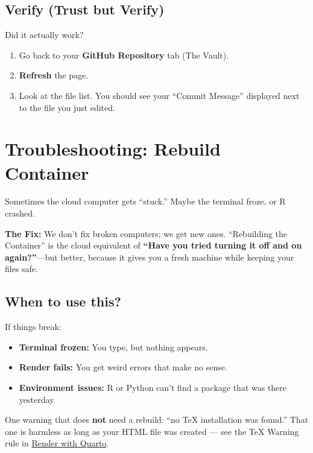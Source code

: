 \documentclass[
  letterpaper,
  DIV=11,
  numbers=noendperiod,
  oneside]{scrreprt}
\providecommand{\tightlist}{%
  \setlength{\itemsep}{0pt}\setlength{\parskip}{0pt}}
\begin{document}
\section{Verify (Trust but Verify)}\label{verify-trust-but-verify}

Did it actually work?

\begin{enumerate}
\def\labelenumi{\arabic{enumi}.}
\tightlist
\item
  Go back to your \textbf{GitHub Repository} tab (The Vault).
\item
  \textbf{Refresh} the page.
\item
  Look at the file list. You should see your ``Commit Message''
  displayed next to the file you just edited.
\end{enumerate}

\chapter{Troubleshooting: Rebuild
Container}\label{troubleshooting-rebuild-container}

Sometimes the cloud computer gets ``stuck.'' Maybe the terminal froze,
or R crashed.

\textbf{The Fix:} We don't fix broken computers; we get new ones.
``Rebuilding the Container'' is the cloud equivalent of \textbf{``Have
you tried turning it off and on again?''}---but better, because it gives
you a fresh machine while keeping your files safe.

\section{When to use this?}\label{when-to-use-this}

If things break:

\begin{itemize}
\tightlist
\item
  \textbf{Terminal frozen:} You type, but nothing appears.
\item
  \textbf{Render fails:} You get weird errors that make no sense.
\item
  \textbf{Environment issues:} R or Python can't find a package that was
  there yesterday.
\end{itemize}

One warning that does \textbf{not} need a rebuild: ``no TeX installation
was found.'' That one is harmless as long as your HTML file was created
--- see the TeX Warning rule in
\hyperref[the-magic-moment-render-quarto]{Render with Quarto}.
\end{document}
